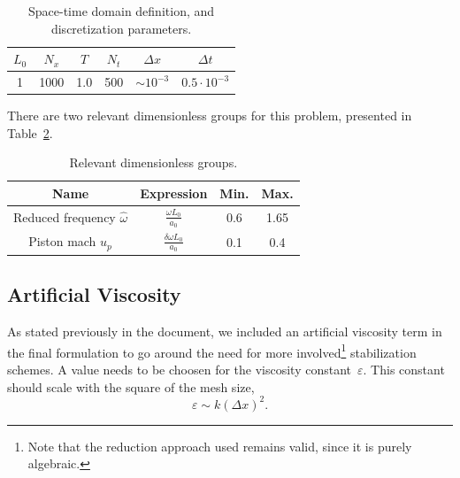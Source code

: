 \documentclass[../../thesis.tex]{subfiles}
\begin{document}
\begin{table}[h]
    \centering
    \caption{Space-time domain definition, and discretization parameters.}
    \begin{tabular}{cccccc}
        \toprule
        $L_0$ & $N_x$      & $T$ & $N_t$  & $\Delta x$     & $\Delta t$          \\ \midrule
        1     & 1000       & 1.0 & 500    & $\sim 10^{-3}$ & $0.5 \cdot 10^{-3}$  \\
        \bottomrule
    \end{tabular}
    \label{tab:discretization_parameters}
\end{table}
There are two relevant dimensionless groups for this problem, presented in Table~\ref{tab:dimensionless_groups}.
\begin{table}[h]
    \centering
    \caption{Relevant dimensionless groups.}
    \begin{tabular}{cccc}
    \toprule
        Name                               & Expression                      & Min. & Max. \\ 
        \midrule
        Reduced frequency $\hat{\omega}$  & $\frac{\omega L_0}{a_0}$        & 0.6   & 1.65 \\[2mm]
        Piston mach $u_p$                 & $\frac{\delta \omega L_0}{a_0}$ & 0.1  & 0.4   \\
        \bottomrule
    \end{tabular}
    \label{tab:dimensionless_groups}
\end{table}

\subsection{Artificial Viscosity}
\label{sec:fom_calibration_artificial_viscosity}
As stated previously in the document, 
we included an artificial viscosity term in the final formulation
to go around the need for more involved\footnote{
    Note that the reduction approach used remains valid,
    since it is purely algebraic.} 
stabilization schemes.
A value needs to be choosen for the viscosity constant~$\varepsilon$.
This constant should scale with the square of the mesh size, 
\begin{equation*}
    \varepsilon \sim k (\Delta x)^2.
\end{equation*}
\end{document}
